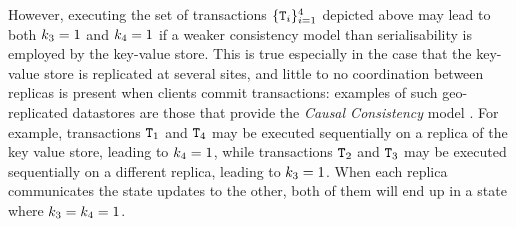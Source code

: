 However, executing the set of transactions $\{\mathtt{T}_{i}\}_{i=1}^{4}$ depicted above 
may lead to both $k_3 = 1$ and $k_4 = 1$ if a weaker consistency model than 
serialisability is employed by the key-value store. This is true especially in the case 
that the key-value store is replicated at several sites, and little to no coordination 
between replicas is present when clients commit transactions: examples of such geo-replicated 
datastores are those that provide the \emph{Causal Consistency} model \cite{cops}. 
For example, transactions $\mathtt{T}_1$ and $\mathtt{T}_4$ may be executed sequentially 
on a replica of the key value store, leading to $k_4 = 1$, while transactions 
$\mathtt{T}_2$ and $\mathtt{T}_3$ may be executed sequentially on a different replica, leading to $k_3 = 1$. 
When each replica communicates the state updates to the other, both of them will 
end up in a state where $k_3 = k_4 = 1$. 


